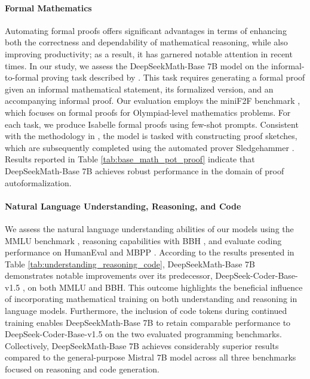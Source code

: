 \begin{itemize}[topsep=0pt]
\paragraph{Formal Mathematics}

Automating formal proofs offers significant advantages in terms of enhancing both the correctness and dependability of mathematical reasoning, while also improving productivity; as a result, it has garnered notable attention in recent times. In our study, we assess the DeepSeekMath-Base 7B model on the informal-to-formal proving task described by \citep{dsp_proof}. This task requires generating a formal proof given an informal mathematical statement, its formalized version, and an accompanying informal proof. Our evaluation employs the miniF2F benchmark \citep{minif2f}, which focuses on formal proofs for Olympiad-level mathematics problems. For each task, we produce Isabelle formal proofs using few-shot prompts. Consistent with the methodology in \cite{dsp_proof}, the model is tasked with constructing proof sketches, which are subsequently completed using the automated prover Sledgehammer \citep{sledgehammer}. Results reported in Table \ref{tab:base_math_pot_proof} indicate that DeepSeekMath-Base 7B achieves robust performance in the domain of proof autoformalization.

\paragraph{Natural Language Understanding, Reasoning, and Code}

We assess the natural language understanding abilities of our models using the MMLU benchmark \citep{mmlu}, reasoning capabilities with BBH \citep{bbh}, and evaluate coding performance on HumanEval \citep{codex} and MBPP \citep{mbpp}. According to the results presented in Table \ref{tab:understanding_reasoning_code}, DeepSeekMath-Base 7B demonstrates notable improvements over its predecessor, DeepSeek-Coder-Base-v1.5 \citep{deepseek-coder}, on both MMLU and BBH. This outcome highlights the beneficial influence of incorporating mathematical training on both understanding and reasoning in language models. Furthermore, the inclusion of code tokens during continued training enables DeepSeekMath-Base 7B to retain comparable performance to DeepSeek-Coder-Base-v1.5 on the two evaluated programming benchmarks. Collectively, DeepSeekMath-Base 7B achieves considerably superior results compared to the general-purpose Mistral 7B model \citep{mistral} across all three benchmarks focused on reasoning and code generation.


\end{itemize}
